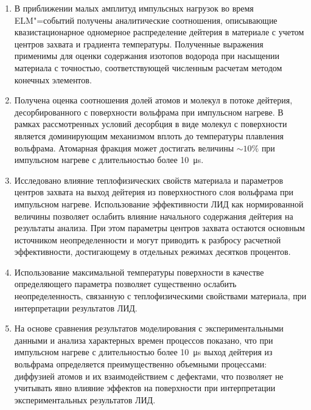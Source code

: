 \begin{enumerate}
  \item В приближении малых амплитуд импульсных нагрузок во время ELM"=событий получены аналитические соотношения, описывающие квазистационарное одномерное распределение дейтерия в материале с учетом центров захвата и градиента температуры. Полученные выражения применимы для оценки содержания изотопов водорода при насыщении материала с точностью, соответствующей численным расчетам методом конечных элементов.
  \item Получена оценка соотношения долей атомов и молекул в потоке дейтерия, десорбированного с поверхности вольфрама при импульсном нагреве. В рамках рассмотренных условий десорбция в виде молекул с поверхности является доминирующим механизмом вплоть до температуры плавления вольфрама. Атомарная фракция может достигать величины \( \sim 10 \% \) при импульсном нагреве с длительностью более \SI{10}{\micro\second}.
  \item Исследовано влияние теплофизических свойств материала и параметров центров захвата на выход дейтерия из поверхностного слоя вольфрама при импульсном нагреве. Использование эффективности ЛИД как нормированной величины позволяет ослабить влияние начального содержания дейтерия на результаты анализа. При этом параметры центров захвата остаются основным источником неопределенности и могут приводить к разбросу расчетной эффективности, достигающему в отдельных режимах десятков процентов.
  \item Использование максимальной температуры поверхности в качестве определяющего параметра позволяет существенно ослабить неопределенность, связанную с теплофизическими свойствами материала, при интерпретации результатов ЛИД.
  \item На основе сравнения результатов моделирования с экспериментальными данными и анализа характерных времен процессов показано, что при импульсном нагреве с длительностью более \SI{10}{\micro\second} выход дейтерия из вольфрама определяется преимущественно объемными процессами: диффузией атомов и их взаимодействием с дефектами, что позволяет не учитывать явно влияние эффектов на поверхности при интерпретации экспериментальных результатов ЛИД.
\end{enumerate}
